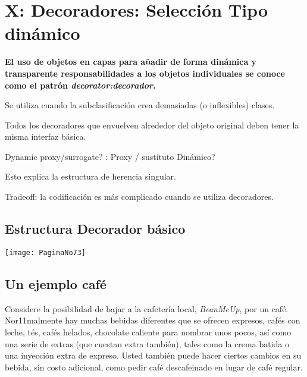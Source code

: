 \section*{\texorpdfstring{X: Decoradores: \newline  Selección Tipo dinámico}{X: Decoradores:  Selección Tipo dinámico}}
\label{sec:xdstd}



\textbf{El uso de objetos en capas para añadir de forma dinámica y transparente responsabilidades a los objetos individuales se conoce como el patrón \textit{decorator:decorador}.} \newline

Se utiliza cuando la subclasificación crea demasiadas (o inflexibles) clases.   \newline

Todos los decoradores que envuelven alrededor del objeto original deben tener la misma interfaz básica. \newline

Dynamic proxy/surrogate? : Proxy / sustituto Dinámico?  \newline

Esto explica la estructura de herencia singular.    \newline

Tradeoff:  la codificación es más complicado cuando se utiliza decoradores.

\newpage

\subsection*{Estructura Decorador básico}
\label{subsec:edb}

\texttt{[image: PaginaNo73]}

\subsection*{Un ejemplo café}
\label{subsec:uec}

Considere la posibilidad de bajar a la cafetería local, \textit{BeanMeUp}, por un café. Nor11malmente hay muchas bebidas diferentes que se ofrecen \-\- expresos, cafés con leche, tés, cafés helados, chocolate caliente para nombrar unos pocos, así como una serie de extras (que cuestan extra también), tales como la crema batida o una inyección extra de expreso. Usted también puede hacer ciertos cambios en su bebida, sin costo adicional, como pedir café descafeinado en lugar de café regular.     \newline

